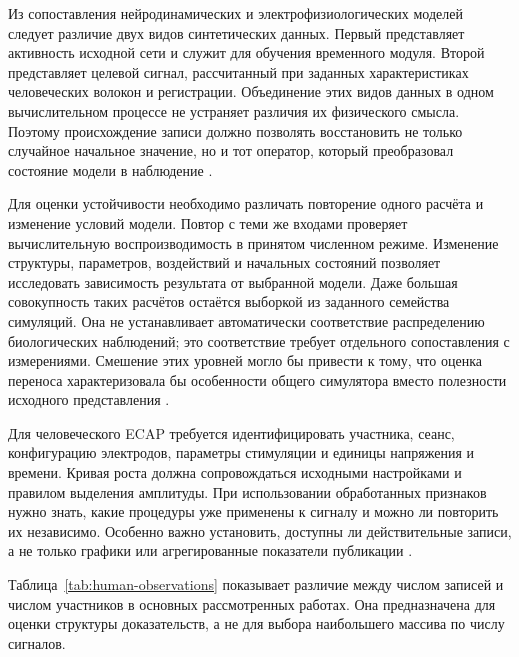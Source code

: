 Из сопоставления нейродинамических и электрофизиологических моделей следует различие двух видов синтетических данных. Первый представляет активность исходной сети и служит для обучения временного модуля. Второй представляет целевой сигнал, рассчитанный при заданных характеристиках человеческих волокон и регистрации. Объединение этих видов данных в одном вычислительном процессе не устраняет различия их физического смысла. Поэтому происхождение записи должно позволять восстановить не только случайное начальное значение, но и тот оператор, который преобразовал состояние модели в наблюдение \cite{s285,ecapmodel,s746}.

Для оценки устойчивости необходимо различать повторение одного расчёта и изменение условий модели. Повтор с теми же входами проверяет вычислительную воспроизводимость в принятом численном режиме. Изменение структуры, параметров, воздействий и начальных состояний позволяет исследовать зависимость результата от выбранной модели. Даже большая совокупность таких расчётов остаётся выборкой из заданного семейства симуляций. Она не устанавливает автоматически соответствие распределению биологических наблюдений; это соответствие требует отдельного сопоставления с измерениями. Смешение этих уровней могло бы привести к тому, что оценка переноса характеризовала бы особенности общего симулятора вместо полезности исходного представления \cite{s743,s836}.

Для человеческого ECAP требуется идентифицировать участника, сеанс, конфигурацию электродов, параметры стимуляции и единицы напряжения и времени. Кривая роста должна сопровождаться исходными настройками и правилом выделения амплитуды. При использовании обработанных признаков нужно знать, какие процедуры уже применены к сигналу и можно ли повторить их независимо. Особенно важно установить, доступны ли действительные записи, а не только графики или агрегированные показатели публикации \cite{posture,s105}.

Таблица~\ref{tab:human-observations} показывает различие между числом записей и числом участников в основных рассмотренных работах. Она предназначена для оценки структуры доказательств, а не для выбора наибольшего массива по числу сигналов.

